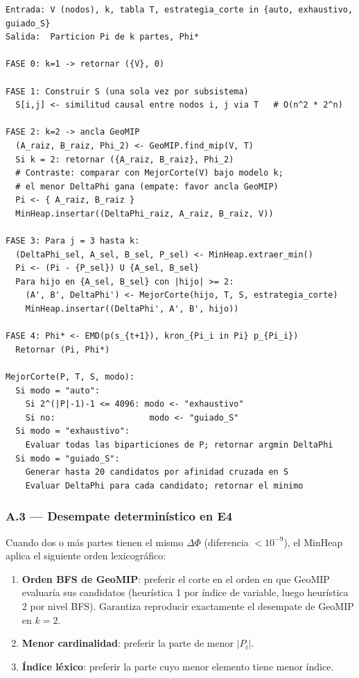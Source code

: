 \begin{verbatim}
Entrada: V (nodos), k, tabla T, estrategia_corte in {auto, exhaustivo, guiado_S}
Salida:  Particion Pi de k partes, Phi*

FASE 0: k=1 -> retornar ({V}, 0)

FASE 1: Construir S (una sola vez por subsistema)
  S[i,j] <- similitud causal entre nodos i, j via T   # O(n^2 * 2^n)

FASE 2: k=2 -> ancla GeoMIP
  (A_raiz, B_raiz, Phi_2) <- GeoMIP.find_mip(V, T)
  Si k = 2: retornar ({A_raiz, B_raiz}, Phi_2)
  # Contraste: comparar con MejorCorte(V) bajo modelo k;
  # el menor DeltaPhi gana (empate: favor ancla GeoMIP)
  Pi <- { A_raiz, B_raiz }
  MinHeap.insertar((DeltaPhi_raiz, A_raiz, B_raiz, V))

FASE 3: Para j = 3 hasta k:
  (DeltaPhi_sel, A_sel, B_sel, P_sel) <- MinHeap.extraer_min()
  Pi <- (Pi - {P_sel}) U {A_sel, B_sel}
  Para hijo en {A_sel, B_sel} con |hijo| >= 2:
    (A', B', DeltaPhi') <- MejorCorte(hijo, T, S, estrategia_corte)
    MinHeap.insertar((DeltaPhi', A', B', hijo))

FASE 4: Phi* <- EMD(p(s_{t+1}), kron_{Pi_i in Pi} p_{Pi_i})
  Retornar (Pi, Phi*)

MejorCorte(P, T, S, modo):
  Si modo = "auto":
    Si 2^(|P|-1)-1 <= 4096: modo <- "exhaustivo"
    Si no:                   modo <- "guiado_S"
  Si modo = "exhaustivo":
    Evaluar todas las biparticiones de P; retornar argmin DeltaPhi
  Si modo = "guiado_S":
    Generar hasta 20 candidatos por afinidad cruzada en S
    Evaluar DeltaPhi para cada candidato; retornar el minimo
\end{verbatim}

\subsubsection*{A.3 — Desempate determinístico en E4}

Cuando dos o más partes tienen el mismo $\Delta\Phi$ (diferencia $< 10^{-9}$),
el MinHeap aplica el siguiente orden lexicográfico:

\begin{enumerate}
  \item \textbf{Orden BFS de GeoMIP}: preferir el corte en el orden en que
        GeoMIP evaluaría sus candidatos (heurística 1 por índice de variable,
        luego heurística 2 por nivel BFS).
        Garantiza reproducir exactamente el desempate de GeoMIP en $k=2$.
  \item \textbf{Menor cardinalidad}: preferir la parte de menor $|P_i|$.
  \item \textbf{Índice léxico}: preferir la parte cuyo menor elemento tiene
        menor índice.
\end{enumerate}

